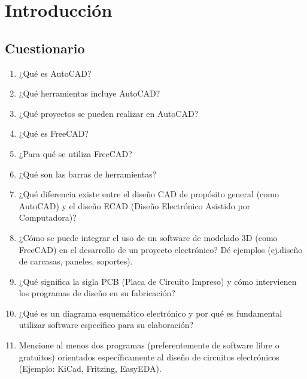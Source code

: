 \documentclass[../main]{subfiles}
\begin{document}
\chapter{Introducción}
\section{Cuestionario}
\begin{enumerate}
  \item ¿Qué es AutoCAD?
  \item ¿Qué herramientas incluye AutoCAD?
  \item ¿Qué proyectos se pueden realizar en AutoCAD?
  \item ¿Qué es FreeCAD?
  \item ¿Para qué se utiliza FreeCAD?
  \item ¿Qué son las barras de herramientas?
  \item ¿Qué diferencia existe entre el diseño CAD de propósito
    general (como AutoCAD) y el diseño ECAD (Diseño Electrónico
    Asistido por Computadora)?
  \item ¿Cómo se puede integrar el uso de un software de modelado 3D
    (como FreeCAD) en el desarrollo de un proyecto electrónico? Dé
    ejemplos (ej.diseño de carcasas, paneles, soportes).
  \item ¿Qué significa la sigla PCB (Placa de Circuito Impreso) y
    cómo intervienen los programas de diseño en su fabricación?
  \item ¿Qué es un diagrama esquemático electrónico y por qué es
    fundamental utilizar software específico para su elaboración?
  \item Mencione al menos dos programas (preferentemente de software
    libre o gratuitos) orientados específicamente al diseño de
    circuitos electrónicos (Ejemplo: KiCad, Fritzing, EasyEDA).
\end{enumerate}
\end{document}
